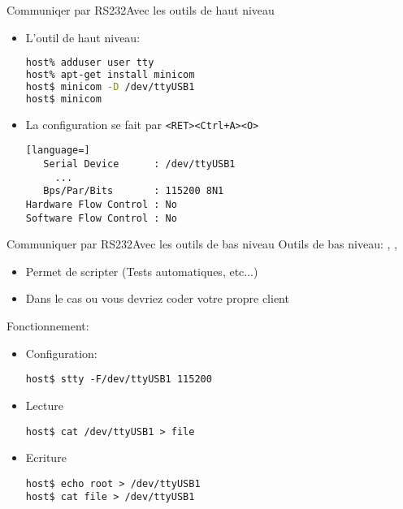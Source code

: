\begin{frame}[fragile=singleslide]{Communiqer par RS232}{Avec les outils de haut niveau}
  \begin{itemize}
  \item L'outil de haut niveau: 
\begin{lstlisting}[language=sh]
host% adduser user tty
host% apt-get install minicom
host$ minicom -D /dev/ttyUSB1
host$ minicom
\end{lstlisting} %
  \item La configuration se fait par \verb/<RET><Ctrl+A><O>/
\begin{lstlisting}[language=]
   Serial Device      : /dev/ttyUSB1
     ...
   Bps/Par/Bits       : 115200 8N1
Hardware Flow Control : No
Software Flow Control : No
\end{lstlisting}
  \end{itemize}
\end{frame}

\begin{frame}[fragile=singleslide]{Communiquer par RS232}{Avec les outils de bas niveau}
  Outils de bas niveau: , , 
  \begin{itemize}
  \item Permet de scripter (Tests automatiques, etc...)
  \item Dans le cas ou vous devriez coder votre propre client
  \end{itemize}
  Fonctionnement:
  \begin{itemize}
  \item Configuration:
\begin{lstlisting}
host$ stty -F/dev/ttyUSB1 115200
\end{lstlisting} %
  \item Lecture
\begin{lstlisting}
host$ cat /dev/ttyUSB1 > file
\end{lstlisting} %
  \item Ecriture
\begin{lstlisting}
host$ echo root > /dev/ttyUSB1
host$ cat file > /dev/ttyUSB1
\end{lstlisting} %
  \end{itemize}
\end{frame}

